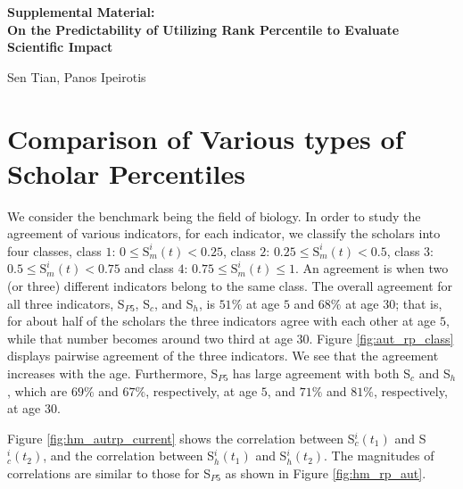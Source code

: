 \clearpage
\begin{refsection}
\beginsupplement
\appendix
{}
\begin{center}
\textbf{\large Supplemental Material: \\ On the Predictability of Utilizing Rank Percentile to Evaluate Scientific Impact}

Sen Tian, Panos Ipeirotis
\end{center}

\section{Comparison of Various types of Scholar Percentiles}
\label{sec:suppl_similarity_autrp}

We consider the benchmark being the field of biology. In order to study the agreement of various indicators, for each indicator, we classify the scholars into four classes, class $1$: $0\le \text{S}_m^{i}(t) < 0.25$, class $2$: $0.25\le \text{S}_m^{i}(t) < 0.5$, class $3$: $0.5 \le \text{S}_m^{i}(t) < 0.75$ and class $4$: $0.75 \le \text{S}_m^{i}(t) \le 1$. An agreement is when two (or three) different indicators belong to the same class. The overall agreement for all three indicators, S$_{P5}$, S$_c$, and S$_h$, is $51\%$ at age $5$ and $68\%$ at age $30$; that is, for about half of the scholars the three indicators agree with each other at age $5$, while that number becomes around two third at age $30$. Figure \ref{fig:aut_rp_class} displays pairwise agreement of the three indicators. We see that the agreement increases with the age. Furthermore, S$_{P5}$ has large agreement with both S$_{c}$ and S$_{h}$, which are $69\%$ and $67\%$, respectively, at age $5$, and $71\%$ and $81\%$, respectively, at age $30$. 

Figure \ref{fig:hm_autrp_current} shows the correlation between S$_c^{i}(t_1)$ and S$_c^{i}(t_2)$, and the correlation between S$_h^{i}(t_1)$ and S$_h^{i}(t_2)$. The magnitudes of correlations are similar to those for S$_{P5}$ as shown in Figure \ref{fig:hm_rp_aut}.


\end{refsection}
